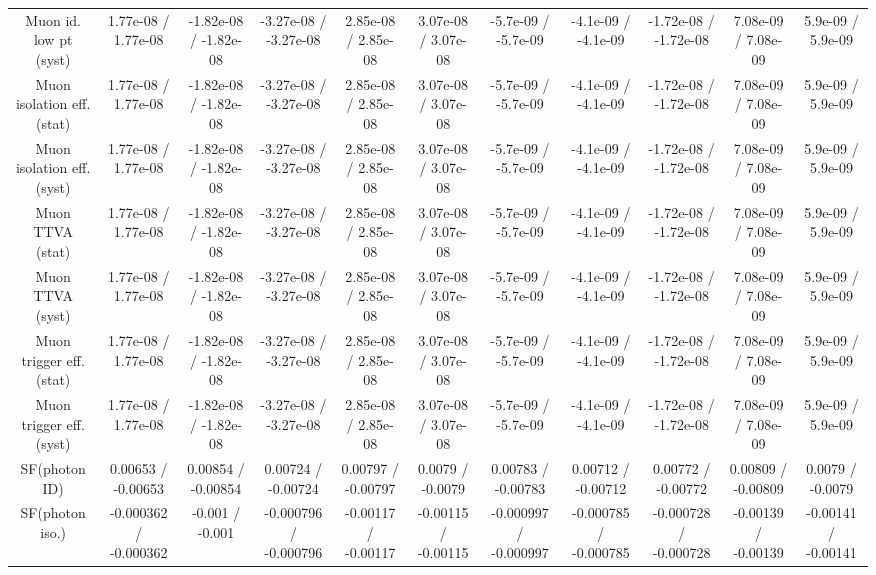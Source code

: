 \begin{table}[htbp]
\begin{center}
\begin{tabular}{|c|c|c|c|c|c|c|c|c|c|c|}
  Muon id. low pt (syst) & 1.77e-08 / 1.77e-08 & -1.82e-08 / -1.82e-08 & -3.27e-08 / -3.27e-08 & 2.85e-08 / 2.85e-08 & 3.07e-08 / 3.07e-08 & -5.7e-09 / -5.7e-09 & -4.1e-09 / -4.1e-09 & -1.72e-08 / -1.72e-08 & 7.08e-09 / 7.08e-09 & 5.9e-09 / 5.9e-09 \\ 
  Muon isolation eff. (stat) & 1.77e-08 / 1.77e-08 & -1.82e-08 / -1.82e-08 & -3.27e-08 / -3.27e-08 & 2.85e-08 / 2.85e-08 & 3.07e-08 / 3.07e-08 & -5.7e-09 / -5.7e-09 & -4.1e-09 / -4.1e-09 & -1.72e-08 / -1.72e-08 & 7.08e-09 / 7.08e-09 & 5.9e-09 / 5.9e-09 \\ 
  Muon isolation eff. (syst) & 1.77e-08 / 1.77e-08 & -1.82e-08 / -1.82e-08 & -3.27e-08 / -3.27e-08 & 2.85e-08 / 2.85e-08 & 3.07e-08 / 3.07e-08 & -5.7e-09 / -5.7e-09 & -4.1e-09 / -4.1e-09 & -1.72e-08 / -1.72e-08 & 7.08e-09 / 7.08e-09 & 5.9e-09 / 5.9e-09 \\ 
  Muon TTVA (stat) & 1.77e-08 / 1.77e-08 & -1.82e-08 / -1.82e-08 & -3.27e-08 / -3.27e-08 & 2.85e-08 / 2.85e-08 & 3.07e-08 / 3.07e-08 & -5.7e-09 / -5.7e-09 & -4.1e-09 / -4.1e-09 & -1.72e-08 / -1.72e-08 & 7.08e-09 / 7.08e-09 & 5.9e-09 / 5.9e-09 \\ 
  Muon TTVA (syst) & 1.77e-08 / 1.77e-08 & -1.82e-08 / -1.82e-08 & -3.27e-08 / -3.27e-08 & 2.85e-08 / 2.85e-08 & 3.07e-08 / 3.07e-08 & -5.7e-09 / -5.7e-09 & -4.1e-09 / -4.1e-09 & -1.72e-08 / -1.72e-08 & 7.08e-09 / 7.08e-09 & 5.9e-09 / 5.9e-09 \\ 
  Muon trigger eff. (stat) & 1.77e-08 / 1.77e-08 & -1.82e-08 / -1.82e-08 & -3.27e-08 / -3.27e-08 & 2.85e-08 / 2.85e-08 & 3.07e-08 / 3.07e-08 & -5.7e-09 / -5.7e-09 & -4.1e-09 / -4.1e-09 & -1.72e-08 / -1.72e-08 & 7.08e-09 / 7.08e-09 & 5.9e-09 / 5.9e-09 \\ 
  Muon trigger eff. (syst) & 1.77e-08 / 1.77e-08 & -1.82e-08 / -1.82e-08 & -3.27e-08 / -3.27e-08 & 2.85e-08 / 2.85e-08 & 3.07e-08 / 3.07e-08 & -5.7e-09 / -5.7e-09 & -4.1e-09 / -4.1e-09 & -1.72e-08 / -1.72e-08 & 7.08e-09 / 7.08e-09 & 5.9e-09 / 5.9e-09 \\ 
  SF(photon ID) & 0.00653 / -0.00653 & 0.00854 / -0.00854 & 0.00724 / -0.00724 & 0.00797 / -0.00797 & 0.0079 / -0.0079 & 0.00783 / -0.00783 & 0.00712 / -0.00712 & 0.00772 / -0.00772 & 0.00809 / -0.00809 & 0.0079 / -0.0079 \\ 
  SF(photon iso.) & -0.000362 / -0.000362 & -0.001 / -0.001 & -0.000796 / -0.000796 & -0.00117 / -0.00117 & -0.00115 / -0.00115 & -0.000997 / -0.000997 & -0.000785 / -0.000785 & -0.000728 / -0.000728 & -0.00139 / -0.00139 & -0.00141 / -0.00141 \\ 

\end{tabular}
\end{center}
\end{table}
